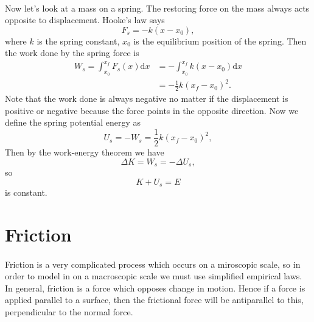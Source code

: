 \documentclass[../newtonian_mechanics.tex]{subfiles}
\begin{document}
        \paragraph{}
        Now let's look at a mass on a spring. The restoring force on the mass always acts opposite to displacement. Hooke's law says
        \begin{equation}
            F_s = -k(x-x_0),
        \end{equation}
        where $k$ is the spring constant, $x_0$ is the equilibrium position of the spring.
        Then the work done by the spring force is
        \begin{align}
            W_s = \int_{x_0}^{x_f}F_s(x)\mathrm{d}x &= -\int_{x_0}^{x_f}k(x-x_0)\mathrm{d}x\\
            &=-\frac{1}{2}k(x_f-x_0)^2.
        \end{align}
        Note that the work done is always negative no matter if the displacement is positive or negative because the force points in the opposite direction.
        Now we define the spring potential energy as
        \begin{equation}
            U_s = -W_s = \frac{1}{2}k(x_f-x_0)^2,
        \end{equation}
        Then by the work-energy theorem we have
        \begin{equation}
            \Delta K = W_s = -\Delta U_s,
        \end{equation}
        so
        \begin{equation}
            K + U_s = E
        \end{equation}
        is constant.

    \section{Friction}
        \paragraph{}
        Friction is a very complicated process which occurs on a miroscopic scale, so in order to model in on a macroscopic scale we must use simplified empirical laws.
        In general, friction is a force which opposes change in motion. Hence if a force is applied parallel to a surface, then the frictional force will be antiparallel to this, perpendicular to the normal force.
\end{document}

